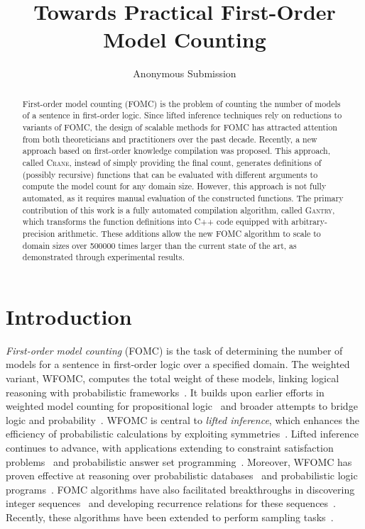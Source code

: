 \documentclass[letterpaper]{article} %
\title{Towards Practical First-Order Model Counting}
\author{Anonymous Submission}
\theoremstyle{remark}
\theoremstyle{definition}
\newcommand{\Cranetwo}{\textsc{Gantry}}
\begin{document}
\maketitle

\begin{abstract}
  First-order model counting (FOMC) is the problem of counting the number of
  models of a sentence in first-order logic. Since lifted inference techniques
  rely on reductions to variants of FOMC, the design of scalable methods for
  FOMC has attracted attention from both theoreticians and practitioners over
  the past decade. Recently, a new approach based on first-order knowledge
  compilation was proposed. This approach, called \textsc{Crane}, instead of
  simply providing the final count, generates definitions of (possibly
  recursive) functions that can be evaluated with different arguments to compute
  the model count for any domain size. However, this approach is not fully
  automated, as it requires manual evaluation of the constructed functions. The
  primary contribution of this work is a fully automated compilation algorithm,
  called \Cranetwo{}, which transforms the function definitions into C++ code
  equipped with arbitrary-precision arithmetic. These additions allow the new
  FOMC algorithm to scale to domain sizes over \num{500000} times larger than
  the current state of the art, as demonstrated through experimental results.
\end{abstract}

\section{Introduction}


\emph{First-order model counting} (FOMC) is the task of determining the number
of models for a sentence in first-order logic over a specified domain. The
weighted variant, WFOMC, computes the total weight of these models, linking
logical reasoning with probabilistic
frameworks~\cite{DBLP:conf/ijcai/BroeckTMDR11}. It builds upon earlier efforts
in weighted model counting for propositional
logic~\cite{DBLP:journals/ai/ChaviraD08} and broader attempts to bridge logic
and
probability~\cite{DBLP:journals/ai/Nilsson86,novak2012mathematical,vsaletic2024graded}.
WFOMC is central to \emph{lifted inference}, which enhances the efficiency of
probabilistic calculations by exploiting
symmetries~\cite{DBLP:conf/ecai/Kersting12}. Lifted inference continues to
advance, with applications extending to constraint satisfaction
problems~\cite{DBLP:journals/jair/TotisDRK23} and probabilistic answer set
programming~\cite{DBLP:journals/ijar/AzzoliniR23}. Moreover, WFOMC has proven
effective at reasoning over probabilistic
databases~\cite{DBLP:journals/debu/GribkoffSB14} and probabilistic logic
programs~\cite{DBLP:journals/ijar/RiguzziBZCL17}. FOMC algorithms have also
facilitated breakthroughs in discovering integer
sequences~\cite{DBLP:conf/ijcai/SvatosJT0K23} and developing recurrence
relations for these sequences~\cite{DBLP:conf/kr/DilkasB23}. Recently, these
algorithms have been extended to perform sampling
tasks~\cite{DBLP:journals/ai/WangPWK24}.
\end{document}

